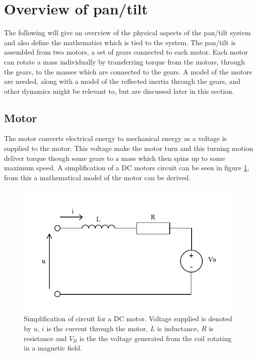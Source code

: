 \section{Overview of pan/tilt}
The following will give an overview of the physical aspects of the pan/tilt system and also define the mathematics which is tied to the system. The pan/tilt is assembled from two motors, a set of gears connected to each motor. Each motor can rotate a mass individually by transferring torque from the motors, through the gears, to the masses which are connected to the gears. A model of the motors are needed, along with a model of the reflected inertia through the gears, and other dynamics might be relevant to, but are discussed later in this section.

\subsection{Motor}
The motor converts electrical energy to mechanical energy as a voltage is supplied to the motor. This voltage make the motor turn and this turning motion deliver torque though some gears to a mass which then spins up to some maximum speed. A simplification of a DC motors circuit can be seen in figure \ref{fig:motor_circuit}, from this a mathematical model of the motor can be derived.
\begin{figure}[htb]
	\begin{center}
	\includegraphics[scale=1,trim=0 0 0 0]{graphics/motor_circuit.pdf} %
	\caption{Simplification of circuit for a DC motor. Voltage supplied is denoted by $u$, $i$ is the current through the motor, $L$ is inductance, $R$ is resistance and $V_B$ is the the voltage generated from the coil rotating in a magnetic field.}
	\label{fig:motor_circuit}			%
	\end{center}
\end{figure}
